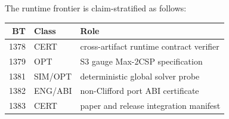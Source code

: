 The runtime frontier is claim-stratified as follows:

\begin{center}
\begin{tabular}{rll}
\toprule
BT & Class & Role\\
\midrule
1378 & CERT & cross-artifact runtime contract verifier\\
1379 & OPT & S3 gauge Max-2CSP specification\\
1381 & SIM/OPT & deterministic global solver probe\\
1382 & ENG/ABI & non-Clifford port ABI certificate\\
1383 & CERT & paper and release integration manifest\\
\bottomrule
\end{tabular}
\end{center}
